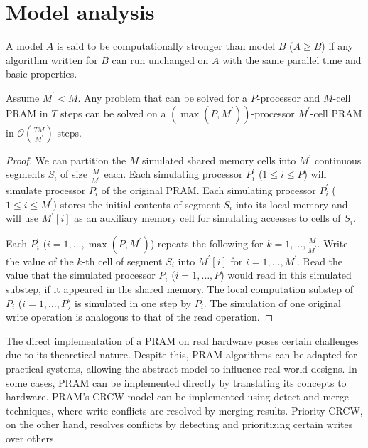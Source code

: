 \section{Model analysis}

\begin{definition}
    A model $A$ is said to be computationally stronger than model $B$ ($A \geq B$) if any algorithm written for $B$ can run unchanged on $A$ with the same parallel time and basic properties.
\end{definition}
\begin{lemma}
    Assume $M^\prime < M$. 
    Any problem that can be solved for a $P$-processor and $M$-cell PRAM in $T$ steps can be solved on a $(\max(P, M^\prime))$-processor $M^\prime$-cell PRAM in $\mathcal{O}\left(\frac{TM}{M^\prime}\right)$ steps.
\end{lemma}

\begin{proof}
    We can partition the $M$ simulated shared memory cells into $M^\prime$ continuous segments $S_i$ of size $\frac{M}{M^\prime}$ each.
    Each simulating processor $P^\prime_i$ ($1 \leq i \leq P$) will simulate processor $P_i$ of the original PRAM.
    Each simulating processor $P^\prime_i$ ($1 \leq i \leq M^\prime$) stores the initial contents of segment $S_i$ into its local memory and will use $M^\prime[i]$ as an auxiliary memory cell for simulating accesses to cells of $S_i$.
    
    Each $P^\prime_i$ ($i=1, \ldots, \max(P, M^\prime)$) repeats the following for $k = 1, \ldots, \frac{M}{M^\prime}$. 
    Write the value of the $k$-th cell of segment $S_i$ into $M^\prime[i]$ for $i=1, \ldots, M^\prime$.
    Read the value that the simulated processor $P_i$ ($i=1, \ldots, P$) would read in this simulated substep, if it appeared in the shared memory.
    The local computation substep of $P_i$ ($i=1, \ldots, P$) is simulated in one step by $P^\prime_i$.
    The simulation of one original write operation is analogous to that of the read operation.
\end{proof}

The direct implementation of a PRAM on real hardware poses certain challenges due to its theoretical nature. 
Despite this, PRAM algorithms can be adapted for practical systems, allowing the abstract model to influence real-world designs.
In some cases, PRAM can be implemented directly by translating its concepts to hardware. 
PRAM's CRCW model can be implemented using detect-and-merge techniques, where write conflicts are resolved by merging results. 
Priority CRCW, on the other hand, resolves conflicts by detecting and prioritizing certain writes over others. 

